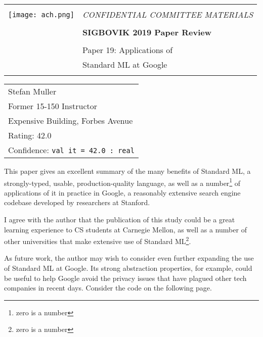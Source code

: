 \documentclass[12pt]{article}
\begin{document}
{\sffamily
\begin{tabular}{ll}
\multirow{3}{*}{\texttt{[image: ach.png]}}\\
& \Large{\em CONFIDENTIAL COMMITTEE MATERIALS} \\
&\\
& \textbf{\Huge{SIGBOVIK 2019 Paper Review}} \\
&\\
& \LARGE{Paper 19: Applications of} \\[0.25em]
& \LARGE{Standard ML at Google} \\
&\\
\hline
\end{tabular}}
\vspace{2em}
\pagestyle{empty}

{\large\bf
\begin{tabular}{l}
  Stefan Muller\\
  Former 15-150 Instructor\\
  Expensive Building, Forbes Avenue\\
Rating: 42.0 \\
Confidence: \texttt{val it = 42.0 : real}\\
\end{tabular}}
\vspace{1em}

This paper gives an excellent summary of the many benefits of Standard ML,
a strongly-typed, usable, production-quality language, as well as a
number\footnote{zero is a number} of applications of it in practice in
Google, a reasonably extensive search engine codebase developed by researchers
at Stanford.

I agree with the author that the publication of this study could be a great
learning experience to CS students at Carnegie Mellon, as well as a number
of other universities that make extensive use of Standard
ML\footnote{zero is a number}.

As future work, the author may wish to consider even further expanding the
use of Standard ML at Google. Its strong abstraction properties, for example,
could be useful to help Google avoid the privacy issues that have plagued
other tech companies in recent days. Consider the code on the following page.

\end{document}
